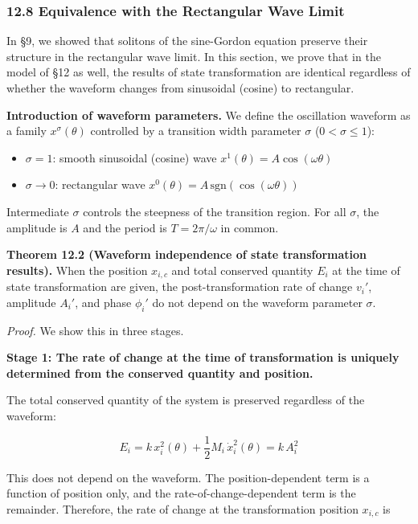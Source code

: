 \documentclass[a4paper,11pt]{article}
\providecommand{\tightlist}{\setlength{\itemsep}{0pt}\setlength{\parskip}{0pt}}
\begin{document}
\subsubsection{12.8 Equivalence with the Rectangular Wave
Limit}\label{equivalence-with-the-rectangular-wave-limit}

In §9, we showed that solitons of the sine-Gordon equation preserve
their structure in the rectangular wave limit. In this section, we prove
that in the model of §12 as well, the results of state transformation
are identical regardless of whether the waveform changes from sinusoidal
(cosine) to rectangular.

\textbf{Introduction of waveform parameters.} We define the oscillation
waveform as a family \(x^\sigma(\theta)\) controlled by a transition
width parameter \(\sigma\) (\(0 < \sigma \leq 1\)):

\begin{itemize}
\tightlist
\item
  \(\sigma = 1\): smooth sinusoidal (cosine) wave
  \(x^1(\theta) = A\cos(\omega\theta)\)
\item
  \(\sigma \to 0\): rectangular wave
  \(x^0(\theta) = A\,\mathrm{sgn}(\cos(\omega\theta))\)
\end{itemize}

Intermediate \(\sigma\) controls the steepness of the transition region.
For all \(\sigma\), the amplitude is \(A\) and the period is
\(T = 2\pi/\omega\) in common.

\textbf{Theorem 12.2 (Waveform independence of state transformation
results).} When the position \(x_{i,c}\) and total conserved quantity
\(E_i\) at the time of state transformation are given, the
post-transformation rate of change \(v_i'\), amplitude \(A_i'\), and
phase \(\phi_i'\) do not depend on the waveform parameter \(\sigma\).

\emph{Proof.} We show this in three stages.

\textbf{Stage 1: The rate of change at the time of transformation is
uniquely determined from the conserved quantity and position.}

The total conserved quantity of the system is preserved regardless of
the waveform:

\[E_i = k\,x_i^2(\theta) + \frac{1}{2}M_i\,\dot{x}_i^2(\theta) = k\,A_i^2 \tag{W27}\]

This does not depend on the waveform. The position-dependent term is a
function of position only, and the rate-of-change-dependent term is the
remainder. Therefore, the rate of change at the transformation position
\(x_{i,c}\) is
\end{document}
